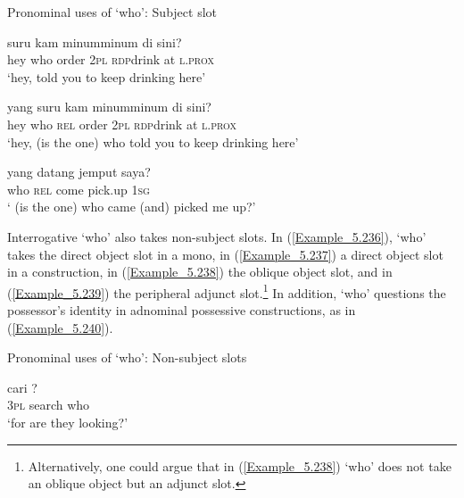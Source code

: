 \begin{styleExampleTitle}
Pronominal uses of  ‘who’: Subject slot
\end{styleExampleTitle}

\ea
\label{Example_5.233}
 {} {suru} {kam} {minum{\Tilde}minum} {di} {sini?}\\ %
 hey  who  order  \textsc{2pl}  \textsc{rdp}{\Tilde}drink  at  \textsc{l.prox}\\
\glt 
‘hey,  told you to keep drinking here’ \textstyleExampleSource{[081014-005-Cv.0006]}
\z

\ea
\label{Example_5.234}
 {} {yang} {suru} {kam} {minum{\Tilde}minum} {di} {sini?}\\ %
 hey  who  \textsc{rel}  order  \textsc{2pl}  \textsc{rdp}{\Tilde}drink  at  \textsc{l.prox}\\
\glt 
‘hey,  (is the one) who told you to keep drinking here’ \textstyleExampleSource{[Elicited MY131112.004]}
\z

\ea
\label{Example_5.235}
 {yang} {datang} {jemput} {saya?}\\ %
 who  \textsc{rel}  come  pick.up  \textsc{1sg}\\
\glt 
‘ (is the one) who came (and) picked me up?’ \textstyleExampleSource{[080918-001-CvNP.0001]}
\z


Interrogative  ‘who’ also takes non-subject slots. In (\ref{Example_5.236}),  ‘who’ takes the direct object slot in a mono, in (\ref{Example_5.237}) a direct object slot in a  construction, in (\ref{Example_5.238}) the oblique object slot, and in (\ref{Example_5.239}) the peripheral adjunct slot.\footnote{Alternatively, one could argue that in (\ref{Example_5.238})  ‘who’ does not take an oblique object but an adjunct slot.} In addition,  ‘who’ questions the possessor’s identity in adnominal possessive constructions, as in (\ref{Example_5.240}).


\begin{styleExampleTitle}
Pronominal uses of  ‘who’: Non-subject slots
\end{styleExampleTitle}

\ea
\label{Example_5.236}
 {cari} {?}\\ %
 \textsc{3pl}  search  who\\
\glt 
‘for  are they looking?’ \textstyleExampleSource{[080921-010-Cv.0010]}
\z


